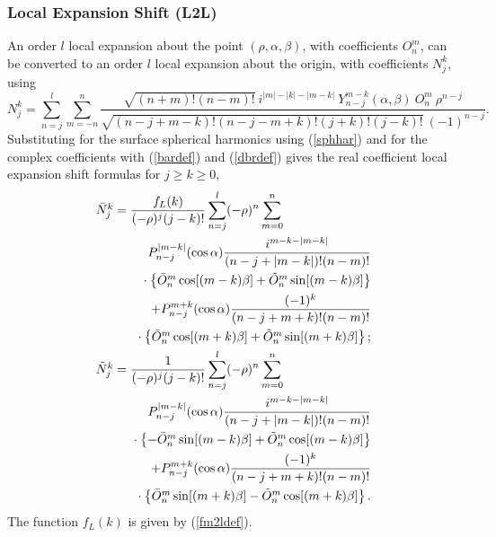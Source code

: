 \subsubsection{Local  Expansion Shift (L2L)}

An order $l$ local expansion about the point
$(\rho, \alpha, \beta)$,
with coefficients $O_n^m$, can be converted to an order $l$ local
expansion about the origin, with coefficients $N_j^k$, using
\begin{equation}
N_j^k = \sum_{n=j}^l\sum_{m=-n}^n\frac{\sqrt{(n+m)!(n-m)!}\:i^{|m|-|k|-|m-k|}\:Y_{n-j}^{m-k}(\alpha, \beta)\:O_n^m\:\rho^{n-j}}{\sqrt{(n-j+m-k)!(n-j-m+k)!(j+k)!(j-k)!}\:(-1)^{n-j}}.
\end{equation}
Substituting for the surface
spherical harmonics using (\ref{sphhar}) and for the
complex coefficients with (\ref{bardef}) and (\ref{dbrdef}) gives the real
coefficient local expansion shift formulas
for $j\geq k\geq 0$,
\begin{eqnarray}
\lefteqn{\Nb{j}{k}=
\frac{f_{L}(k)}{(-\rho)^j(j-k)!}
\sum_{n=j}^l(-\rho)^n\sum_{m=0}^n}\nonumber\\
&&P_{n-j}^{|m-k|}(\cos\alpha)
\frac{i^{m-k-|m-k|}}{(n-j+|m-k|)!(n-m)!}\nonumber\\
&&\rule{0.25in}{0in}\cdot\left\{\Ob{n}{m}\cos[(m-k)\beta]+\Obb{n}{m}\sin[(m-k)\beta]\right\}\nonumber\\
&&+P_{n-j}^{m+k}(\cos\alpha)\frac{(-1)^k}{(n-j+m+k)!(n-m)!}\nonumber\\
&&\rule{0.25in}{0in}\cdot\left\{\Ob{n}{m}\cos[(m+k)\beta]+\Obb{n}{m}\sin[(m+k)\beta]\right\};
\\
\lefteqn{\Nbb{j}{k}=
\frac{1}{(-\rho)^j(j-k)!}
\sum_{n=j}^l(-\rho)^n\sum_{m=0}^n}\nonumber\\
&&P_{n-j}^{|m-k|}(\cos\alpha)
\frac{i^{m-k-|m-k|}}{(n-j+|m-k|)!(n-m)!}\nonumber\\
&&\rule{0.25in}{0in}\cdot\left\{-\Ob{n}{m}\sin[(m-k)\beta]+\Obb{n}{m}\cos[(m-k)\beta]\right\}\nonumber\\
&&+P_{n-j}^{m+k}(\cos\alpha)\frac{(-1)^k}{(n-j+m+k)!(n-m)!}\nonumber\\
&&\rule{0.25in}{0in}\cdot\left\{\Ob{n}{m}\sin[(m+k)\beta]-\Obb{n}{m}\cos[(m+k)\beta]\right\}.
\end{eqnarray}
The function $f_{L}(k)$ is given by (\ref{fm2ldef}).

%
